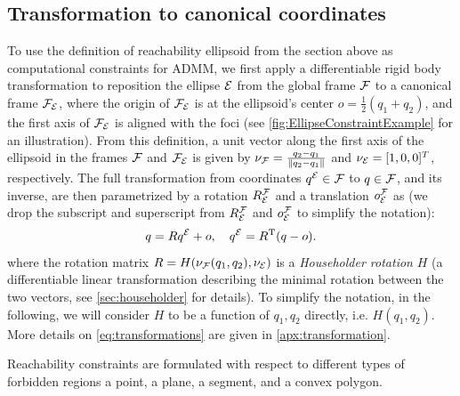 \documentclass[10pt,twocolumn,twoside]{IEEEtran}
\newcommand{\new}[1]{\textcolor{blue}{#1}}
\newcommand{\news}{\color{blue}}
\begin{document}
\subsection{Transformation to canonical coordinates}\label{sec:rotation2Standard}
\newcommand{\oFE}{o}
{\news To use the definition of reachability ellipsoid from the section above as computational constraints for ADMM, we first apply a differentiable rigid body transformation to reposition the ellipse $\mathcal{E}$ from the global frame $\mathcal{F}$ to a canonical frame $\mathcal{F}_{\mathcal{E}}$, where the origin of $\mathcal{F}_{\mathcal{E}}$ is at the ellipsoid's center $\oFE = \frac{1}{2}(q_1+q_2)$, and the first axis of $\mathcal{F}_{\mathcal{E}}$ is aligned with the foci (see \cref{fig:EllipseConstraintExample} for an illustration). 
From this definition, a unit vector along the first axis of the ellipsoid in the frames $\mathcal{F}$ and $\mathcal{F}_{\mathcal{E}}$ is given by $\nu_{\mathcal{F}} = \frac{q_2-q_1}{\lVert q_2-q_1\rVert}$ and $\nu_{\mathcal{E}} =[1,0,0]^T$, respectively.
The full transformation from coordinates $q^{\mathcal{E}}\in\mathcal{F}$ to $q\in\mathcal{F}$, and its inverse, are then parametrized by a rotation $R^{\mathcal{F}}_{\mathcal{E}}$ and a translation $o^{\mathcal{F}}_{\mathcal{E}}$ as (we drop the subscript and superscript from $R^{\mathcal{F}}_{\mathcal{E}}$ and $o^{\mathcal{F}}_{\mathcal{E}}$ to simplify the notation):
\begin{equation}\label{eq:transformations}
  q=R\Eframe{q}+\oFE,\quad
  \Eframe{q}=R\transpose(q-\oFE).
\end{equation}
where the rotation matrix $R=H(\nu_{\mathcal{F}}(q_1,q_2),\nu_{\mathcal{E}})$ is a \emph{Householder rotation} $H$ (a differentiable linear transformation describing the minimal rotation between the two vectors, see \cref{sec:householder} for details).  To simplify the notation, in the following, we will consider $H$ to be a function of $q_1,q_2$ directly, i.e. $H(q_1,q_2)$. More details on \eqref{eq:transformations} are given in \cref{apx:transformation}.

  Reachability constraints are formulated with respect to different types of forbidden regions a point, a plane, a segment, and a convex polygon.}
\end{document}

